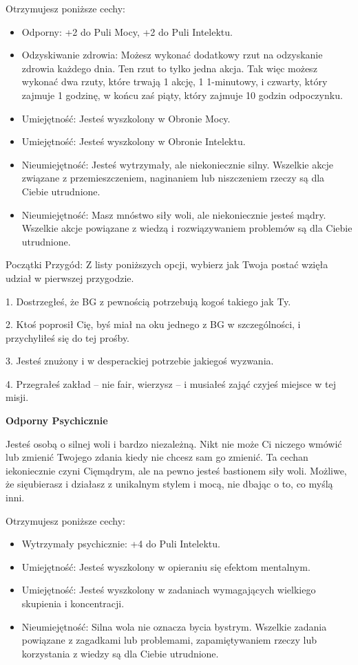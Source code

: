 Otrzymujesz poniższe cechy:
\begin{itemize}
    \item  Odporny: +2 do Puli Mocy, +2 do Puli Intelektu.
    \item  Odzyskiwanie zdrowia: Możesz wykonać dodatkowy rzut na odzyskanie zdrowia każdego dnia. Ten rzut to tylko jedna akcja. Tak więc możesz wykonać dwa rzuty, które trwają 1 akcję, 1 1-minutowy, i czwarty, który zajmuje 1 godzinę, w końcu zaś piąty, który zajmuje 10 godzin odpoczynku.
    \item  Umiejętność: Jesteś wyszkolony w Obronie Mocy.
    \item  Umiejętność: Jesteś wyszkolony w Obronie Intelektu.
    \item  Nieumiejętność: Jesteś wytrzymały, ale niekoniecznie silny. Wszelkie akcje związane z przemieszczeniem, naginaniem lub niszczeniem rzeczy są dla Ciebie utrudnione.
    \item  Nieumiejętność: Masz mnóstwo siły woli, ale niekoniecznie jesteś mądry. Wszelkie akcje powiązane z wiedzą i rozwiązywaniem problemów są dla Ciebie utrudnione.
\end{itemize}

Początki Przygód: Z listy poniższych opcji, wybierz jak Twoja postać wzięła udział w pierwszej przygodzie.

1. Dostrzegłeś, że BG z pewnością potrzebują kogoś takiego jak Ty.

2. Ktoś poprosił Cię, byś miał na oku jednego z BG w szczególności, i przychyliłeś się do tej prośby.

3. Jesteś znużony i w desperackiej potrzebie jakiegoś wyzwania.

4. Przegrałeś zakład – nie fair, wierzysz – i musiałeś zająć czyjeś miejsce w tej misji.

\textbf{Odporny Psychicznie}

Jesteś osobą o silnej woli i bardzo niezależną. Nikt nie może Ci niczego wmówić lub zmienić Twojego zdania kiedy nie chcesz sam go zmienić. Ta cechan iekoniecznie czyni Cięmądrym, ale na pewno jesteś bastionem siły woli. Możliwe, że sięubierasz i działasz z unikalnym stylem i mocą, nie dbając o to, co myślą inni. 

Otrzymujesz poniższe cechy:
\begin{itemize}
    \item  Wytrzymały psychicznie: +4 do Puli Intelektu.
    \item  Umiejętność: Jesteś wyszkolony w opieraniu się efektom mentalnym.
    \item  Umiejętność: Jesteś wyszkolony w zadaniach wymagających wielkiego skupienia i koncentracji.
    \item  Nieumiejętność: Silna wola nie oznacza bycia bystrym. Wszelkie zadania powiązane z zagadkami lub problemami, zapamiętywaniem rzeczy lub korzystania z wiedzy są dla Ciebie utrudnione. 
\end{itemize}

